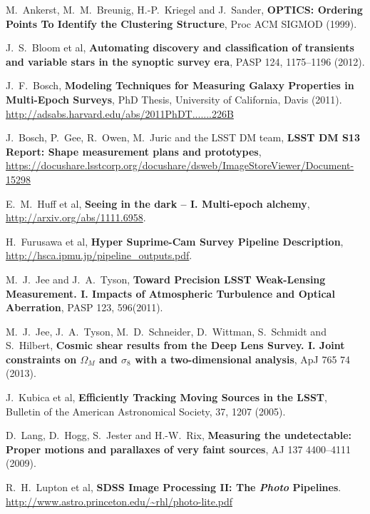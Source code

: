 \documentclass[12pt]{article}
\begin{document}
\begin{thebibliography}{10}

 M.~Ankerst, M.~M.~Breunig, H.-P.~Kriegel and J.~Sander,
  \textbf{OPTICS: Ordering Points To Identify the Clustering Structure},
  Proc ACM SIGMOD (1999).

 J.~S.~Bloom et al,
  \textbf{Automating discovery and classification of transients and variable stars in the synoptic survey era},
  PASP 124, 1175--1196 (2012).

 J.~F.~Bosch,
  \textbf{Modeling Techniques for Measuring Galaxy Properties in Multi-Epoch Surveys},
  PhD Thesis, University of California, Davis (2011). \url{http://adsabs.harvard.edu/abs/2011PhDT.......226B}

 J.~Bosch, P.~Gee, R.~Owen, M.~Juric and the LSST DM team,
  \textbf{LSST DM S13 Report: Shape measurement plans and prototypes},
  \url{https://docushare.lsstcorp.org/docushare/dsweb/ImageStoreViewer/Document-15298}

 E.~M.~Huff et al,
  \textbf{Seeing in the dark -- I. Multi-epoch alchemy},
  \url{http://arxiv.org/abs/1111.6958}.

 H.~Furusawa et al,
  \textbf{Hyper Suprime-Cam Survey Pipeline Description},
  \url{http://hsca.ipmu.jp/pipeline_outputs.pdf}.

 M.~J.~Jee and J.~A.~Tyson,  \textbf{Toward
  Precision LSST Weak-Lensing Measurement. I. Impacts of Atmospheric
  Turbulence and Optical Aberration}, PASP 123, 596(2011).

 M.~J.~Jee, J.~A.~Tyson, M.~D.~Schneider, D.~Wittman, S.~Schmidt and S.~Hilbert,
  \textbf{Cosmic shear results from the Deep Lens Survey. I. Joint constraints on $\Omega_M$ and $\sigma_8$ with a two-dimensional analysis},
  ApJ 765 74 (2013).

 J.~Kubica et al,
  \textbf{Efficiently Tracking Moving Sources in the LSST},
  Bulletin of the American Astronomical Society, 37, 1207 (2005).

 D.~Lang, D.~Hogg, S.~Jester and H.-W.~Rix,
  \textbf{Measuring the undetectable: Proper motions and parallaxes of very faint sources},
  AJ 137 4400--4111 (2009).

 R.~H.~Lupton et al,
  \textbf{SDSS Image Processing II: The \textit{Photo} Pipelines}.
  \url{http://www.astro.princeton.edu/~rhl/photo-lite.pdf}


\end{thebibliography}
\end{document}
